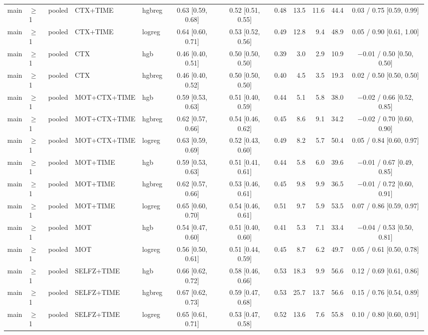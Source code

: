 \begin{longtable}{@{}lllllcccrrrc@{}}
main & $\geq$1 & pooled & CTX+TIME & hgbreg & 0.63 [0.59, 0.68] & 0.52 [0.51, 0.55] & 0.48 & 13.5 & 11.6 & 44.4 & 0.03 / 0.75 [0.59, 0.99] \\
main & $\geq$1 & pooled & CTX+TIME & logreg & 0.64 [0.60, 0.71] & 0.53 [0.52, 0.56] & 0.49 & 12.8 & 9.4 & 48.9 & 0.05 / 0.90 [0.61, 1.00] \\
main & $\geq$1 & pooled & CTX & hgb & 0.46 [0.40, 0.51] & 0.50 [0.50, 0.50] & 0.39 & 3.0 & 2.9 & 10.9 & $-$0.01 / 0.50 [0.50, 0.50] \\
main & $\geq$1 & pooled & CTX & hgbreg & 0.46 [0.40, 0.52] & 0.50 [0.50, 0.50] & 0.40 & 4.5 & 3.5 & 19.3 & 0.02 / 0.50 [0.50, 0.50] \\
main & $\geq$1 & pooled & MOT+CTX+TIME & hgb & 0.59 [0.53, 0.63] & 0.51 [0.40, 0.59] & 0.44 & 5.1 & 5.8 & 38.0 & $-$0.02 / 0.66 [0.52, 0.85] \\
main & $\geq$1 & pooled & MOT+CTX+TIME & hgbreg & 0.62 [0.57, 0.66] & 0.54 [0.46, 0.62] & 0.45 & 8.6 & 9.1 & 34.2 & $-$0.02 / 0.70 [0.60, 0.90] \\
main & $\geq$1 & pooled & MOT+CTX+TIME & logreg & 0.63 [0.59, 0.69] & 0.52 [0.43, 0.60] & 0.49 & 8.2 & 5.7 & 50.4 & 0.05 / 0.84 [0.60, 0.97] \\
main & $\geq$1 & pooled & MOT+TIME & hgb & 0.59 [0.53, 0.63] & 0.51 [0.41, 0.61] & 0.44 & 5.8 & 6.0 & 39.6 & $-$0.01 / 0.67 [0.49, 0.85] \\
main & $\geq$1 & pooled & MOT+TIME & hgbreg & 0.62 [0.57, 0.66] & 0.53 [0.46, 0.61] & 0.45 & 9.8 & 9.9 & 36.5 & $-$0.01 / 0.72 [0.60, 0.91] \\
main & $\geq$1 & pooled & MOT+TIME & logreg & 0.65 [0.60, 0.70] & 0.54 [0.46, 0.61] & 0.51 & 9.7 & 5.9 & 53.5 & 0.07 / 0.86 [0.59, 0.97] \\
main & $\geq$1 & pooled & MOT & hgb & 0.54 [0.47, 0.60] & 0.51 [0.40, 0.60] & 0.41 & 5.3 & 7.1 & 33.4 & $-$0.04 / 0.53 [0.50, 0.81] \\
main & $\geq$1 & pooled & MOT & logreg & 0.56 [0.50, 0.61] & 0.51 [0.44, 0.59] & 0.45 & 8.7 & 6.2 & 49.7 & 0.05 / 0.61 [0.50, 0.78] \\
main & $\geq$1 & pooled & SELFZ+TIME & hgb & 0.66 [0.62, 0.72] & 0.58 [0.46, 0.66] & 0.53 & 18.3 & 9.9 & 56.6 & 0.12 / 0.69 [0.61, 0.86] \\
main & $\geq$1 & pooled & SELFZ+TIME & hgbreg & 0.67 [0.62, 0.73] & 0.59 [0.47, 0.68] & 0.53 & 25.7 & 13.7 & 56.6 & 0.15 / 0.76 [0.54, 0.89] \\
main & $\geq$1 & pooled & SELFZ+TIME & logreg & 0.65 [0.61, 0.71] & 0.53 [0.47, 0.58] & 0.52 & 13.6 & 7.6 & 55.8 & 0.10 / 0.80 [0.60, 0.91] \\

\end{longtable}
